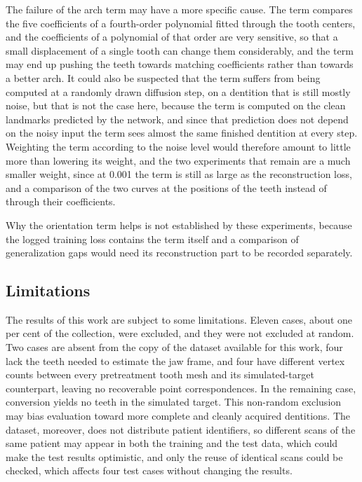 \documentclass[10pt,a4paper]{article}
\begin{document}
The failure of the arch term may have a more specific cause. The term compares the five coefficients of a fourth-order polynomial fitted through the tooth centers, and the coefficients of a polynomial of that order are very sensitive, so that a small displacement of a single tooth can change them considerably, and the term may end up pushing the teeth towards matching coefficients rather than towards a better arch. It could also be suspected that the term suffers from being computed at a randomly drawn diffusion step, on a dentition that is still mostly noise, but that is not the case here, because the term is computed on the clean landmarks predicted by the network, and since that prediction does not depend on the noisy input the term sees almost the same finished dentition at every step. Weighting the term according to the noise level would therefore amount to little more than lowering its weight, and the two experiments that remain are a much smaller weight, since at 0.001 the term is still as large as the reconstruction loss, and a comparison of the two curves at the positions of the teeth instead of through their coefficients.

Why the orientation term helps is not established by these experiments, because the logged training loss contains the term itself and a comparison of generalization gaps would need its reconstruction part to be recorded separately.


\subsection{Limitations}
\label{sec:limitations}

The results of this work are subject to some limitations. Eleven cases, about one per cent of the collection, were excluded, and they were not excluded at random. Two cases are absent from the copy of the dataset available for this work, four lack the teeth needed to estimate the jaw frame, and four have different vertex counts between every pretreatment tooth mesh and its simulated-target counterpart, leaving no recoverable point correspondences. In the remaining case, conversion yields no teeth in the simulated target. This non-random exclusion may bias evaluation toward more complete and cleanly acquired dentitions. The dataset, moreover, does not distribute patient identifiers, so different scans of the same patient may appear in both the training and the test data, which could make the test results optimistic, and only the reuse of identical scans could be checked, which affects four test cases without changing the results.
\end{document}
